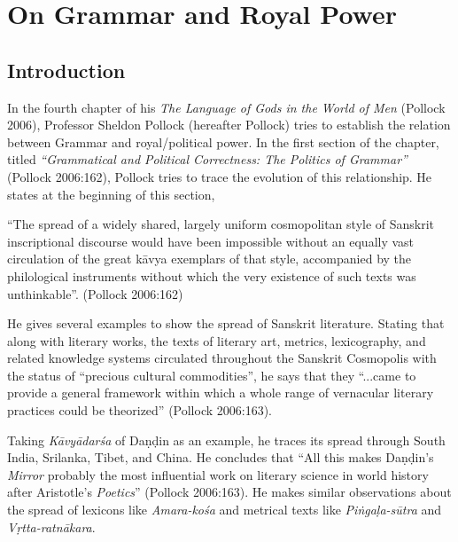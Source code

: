 \chapter{On Grammar and Royal Power}\label{chapter\thechapter:begin}


\section*{Introduction}

In the fourth chapter of his {\sl The Language of Gods in the World of Men} (Pollock 2006), Professor Sheldon Pollock (hereafter Pollock) tries to establish the relation between Grammar and royal/political power.  In the first section of the chapter, titled {\sl ``Grammatical and Political Correctness: The Politics of Grammar''} (Pollock 2006:162), Pollock tries to trace the evolution of this relationship. He states at the beginning of this section, 
\begin{myquote}
``The spread of a widely shared, largely uniform cosmopolitan style of Sanskrit inscriptional discourse would have been impossible without an equally vast circulation of the great kāvya exemplars of that style, accompanied by the philological instruments without which the very existence of such texts was unthinkable''.
\hfill (Pollock 2006:162) 
\end{myquote}

He gives several examples to show the spread of Sanskrit literature. Stating that along with literary works, the texts of literary art, metrics, lexicography, and related knowledge systems circulated throughout the Sanskrit Cosmopolis with the status of ``precious cultural commodities'', he says that they ``...came to provide a general framework within which a whole range of vernacular literary practices could be theorized'' (Pollock 2006:163). 

Taking {\sl Kāvyādarśa} of Daṇḍin as an example, he traces its spread through South India, Srilanka, Tibet, and China. He concludes that ``All this makes Daṇḍin's {\sl Mirror} probably the most influential work on literary science in world history after Aristotle's {\sl Poetics}'' (Pollock 2006:163). He makes similar observations about the spread of lexicons like {\sl Amara-kośa} and metrical texts like {\sl Piṅgaḷa-sūtra} and {\sl Vṛtta-ratnākara}. 

